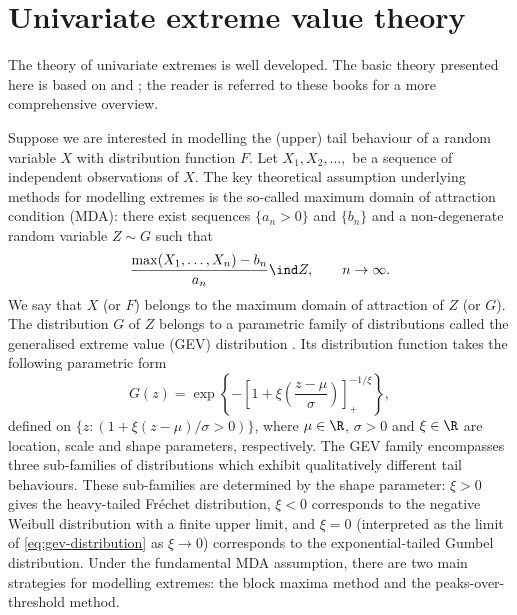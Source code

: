 \documentclass[en-GB, a4paper, nobind]{templates/bathreport}
\begin{document}
\hypertarget{univariate-evt}{%
\section{Univariate extreme value theory}\label{univariate-evt}}

The theory of univariate extremes is well developed. The basic theory presented here is based on \textcite{beirlantStatisticsExtremesTheory2004} and \textcite{colesIntroductionStatisticalModeling2001}; the reader is referred to these books for a more comprehensive overview.

Suppose we are interested in modelling the (upper) tail behaviour of a random variable \(X\) with distribution function \(F\). Let \(X_1,X_2,\ldots,\) be a sequence of independent observations of \(X\). The key theoretical assumption underlying methods for modelling extremes is the so-called maximum domain of attraction condition (MDA): there exist sequences \(\{a_n>0\}\) and \(\{b_n\}\) and a non-degenerate random variable \(Z\sim G\) such that
\begin{equation}
\frac{\max(X_1,\ldots,X_n)-b_n}{a_n} \ind Z, \qquad n\to\infty.
\label{eq:convergence-of-maxima}
\end{equation}
We say that \(X\) (or \(F\)) belongs to the maximum domain of attraction of \(Z\) (or \(G\)). The distribution \(G\) of \(Z\) belongs to a parametric family of distributions called the generalised extreme value (GEV) distribution \autocite{fisherLimitingFormsFrequency1928}. Its distribution function takes the following parametric form
\begin{equation}
G(z) = 
\exp\left\lbrace -\left[1+\xi\left(\frac{z-\mu}{\sigma}\right)\right]_{+}^{-1/\xi}\right\rbrace,
\label{eq:gev-distribution}
\end{equation}
defined on \(\{z:(1+\xi(z-\mu)/\sigma>0)\}\), where \(\mu\in\R\), \(\sigma>0\) and \(\xi\in\R\) are location, scale and shape parameters, respectively. The GEV family encompasses three sub-families of distributions which exhibit qualitatively different tail behaviours. These sub-families are determined by the shape parameter: \(\xi>0\) gives the heavy-tailed Fréchet distribution, \(\xi<0\) corresponds to the negative Weibull distribution with a finite upper limit, and \(\xi=0\) (interpreted as the limit of \eqref{eq:gev-distribution} as \(\xi\to 0\)) corresponds to the exponential-tailed Gumbel distribution. Under the fundamental MDA assumption, there are two main strategies for modelling extremes: the block maxima method and the peaks-over-threshold method.
\end{document}
